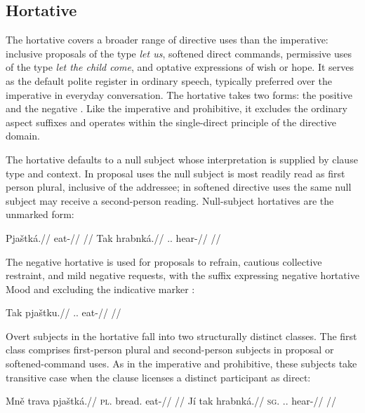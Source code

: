 \subsection{Hortative}\label{sec:mood-hort}

The hortative covers a broader range of directive uses than the imperative:
inclusive proposals of the type \textit{let us}, softened direct commands,
permissive uses of the type \textit{let the child come}, and optative
expressions of wish or hope. It serves as the default polite register in
ordinary speech, typically preferred over the imperative in everyday
conversation. The hortative takes two forms: the positive  and the
negative . Like the imperative and prohibitive, it excludes the
ordinary aspect suffixes and operates within the single-direct principle of the
directive domain.

The hortative defaults to a null subject whose interpretation is supplied by
clause type and context. In proposal uses the null subject is most readily read
as first person plural, inclusive of the addressee; in softened directive uses
the same null subject may receive a second-person reading. Null-subject
hortatives are the unmarked form:

\pex
\a
\begingl
\gla Pjaštká.//
\glb eat-\Hort{}//
\glft {} //
\endgl
\a
\begingl
\gla Tak hrabnká.//
\glb \Dem{}.\Prox{}.\Dir{} hear-\Hort{}//
\glft {} //
\endgl
\xe

The negative hortative  is used for proposals to refrain, cautious
collective restraint, and mild negative requests, with the suffix expressing
negative hortative Mood and excluding the indicative marker :

\pex
\a
\begingl
\gla Tak pjaštku.//
\glb \Dem{}.\Prox{}.\Dir{} eat-\Neg{}\Hort{}//
\glft {} //
\endgl
\xe

Overt subjects in the hortative fall into two structurally distinct classes. The
first class comprises first-person plural and second-person subjects in
proposal or softened-command uses. As in the imperative and prohibitive,
these subjects take transitive case when the clause licenses a distinct
participant as direct:

\pex
\a
\begingl
\gla Mně trava pjaštká.//
\textsc{pl}.\Trs{} bread.\Dir{} eat-\Hort{}//
\glft {} //
\endgl
\a
\begingl
\gla Jí tak hrabnká.//
\textsc{sg}.\Trs{} \Dem{}.\Prox{}.\Dir{} hear-\Hort{}//
\glft {} //
\endgl
\xe

